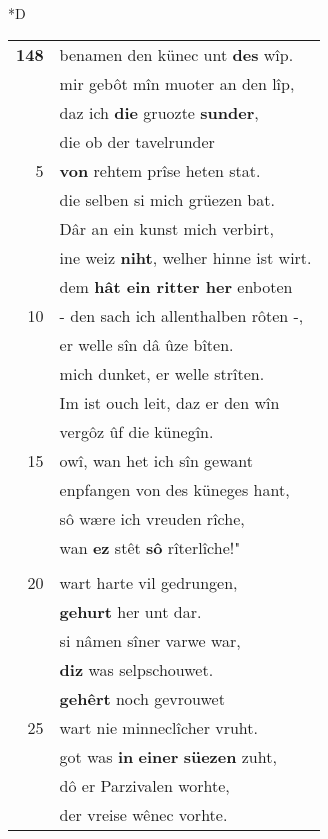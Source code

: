\documentclass[8pt,a4paper,notitlepage]{article}
\begin{document}
\begin{table}[ht]
\begin{minipage}[t]{0.5\linewidth}
\small
\begin{center}*D
\end{center}
\begin{tabular}{rl}
\textbf{148} & benamen den künec unt \textbf{des} wîp.\\ 
 & mir gebôt mîn muoter an den lîp,\\ 
 & daz ich \textbf{die} gruozte \textbf{sunder},\\ 
 & die ob der tavelrunder\\ 
5 & \textbf{von} rehtem prîse heten stat.\\ 
 & die selben si mich grüezen bat.\\ 
 & Dâr an ein kunst mich verbirt,\\ 
 & ine weiz \textbf{niht}, welher hinne ist wirt.\\ 
 & dem \textbf{hât ein ritter her} enboten\\ 
10 & - den sach ich allenthalben rôten -,\\ 
 & er welle sîn dâ ûze bîten.\\ 
 & mich dunket, er welle strîten.\\ 
 & Im ist ouch leit, daz er den wîn\\ 
 & vergôz ûf die künegîn.\\ 
15 & owî, wan het ich sîn gewant\\ 
 & enpfangen von des küneges hant,\\ 
 & sô wære ich vreuden rîche,\\ 
 & wan \textbf{ez} stêt \textbf{sô} rîterlîche!"\\ 
 & \textit{\begin{large}D\end{large}}er knappe unbetwungen\\ 
20 & wart harte vil gedrungen,\\ 
 & \textbf{gehurt} her unt dar.\\ 
 & si nâmen sîner varwe war,\\ 
 & \textbf{diz} was selpschouwet.\\ 
 & \textbf{gehêrt} noch gevrouwet\\ 
25 & wart nie minneclîcher vruht.\\ 
 & got was \textbf{in} \textbf{einer} \textbf{süezen} zuht,\\ 
 & dô er Parzivalen worhte,\\ 
 & der vreise wênec vorhte.\\ 

\end{tabular}
\end{minipage}
\end{table}
\end{document}
